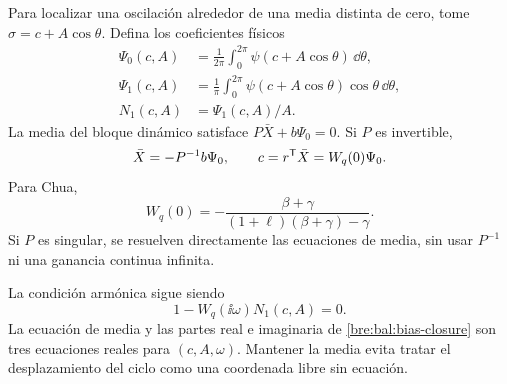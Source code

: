 Para localizar una oscilación alrededor de una media distinta de cero,
tome \(\sigma=c+A\cos\theta\). Defina los coeficientes físicos
\begin{equation}
 \begin{aligned}
 \Psi_0(c,A)&=\frac1{2\pi}\int_0^{2\pi}
       \psi(c+A\cos\theta)\,\dd\theta,\\
 \Psi_1(c,A)&=\frac1\pi\int_0^{2\pi}
       \psi(c+A\cos\theta)\cos\theta\,\dd\theta,\\
 N_1(c,A)&=\Psi_1(c,A)/A.
 \end{aligned}
 \label{bre:bal:bias-fourier}
\end{equation}
La media del bloque dinámico satisface \(P\bar X+b\Psi_0=0\).
Si \(P\) es invertible,
\begin{equation}
 \bar X=-P^{-1}b\Psi_0,\qquad
 c=r^{\mathsf T}\bar X=W_q(0)\Psi_0.
 \label{bre:bal:dc}
\end{equation}
Para Chua,
\begin{equation}
 W_q(0)=-\frac{\beta+\gamma}
 {(1+\ell)(\beta+\gamma)-\gamma}.
 \label{bre:bal:chua-dc}
\end{equation}
Si \(P\) es singular, se resuelven directamente las ecuaciones de
media, sin usar \(P^{-1}\) ni una ganancia continua infinita.

La condición armónica sigue siendo
\begin{equation}
 1-W_q(\ii\omega)N_1(c,A)=0.
 \label{bre:bal:bias-closure}
\end{equation}
La ecuación de media y las partes real e imaginaria de
\eqref{bre:bal:bias-closure} son tres ecuaciones reales para
\((c,A,\omega)\). Mantener la media evita tratar el desplazamiento
del ciclo como una coordenada libre sin ecuación.


